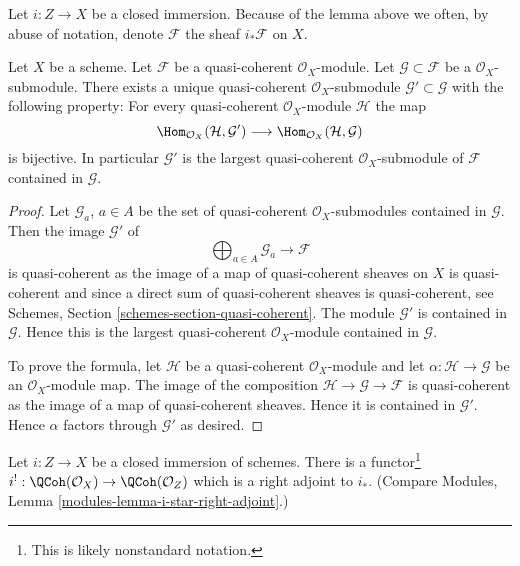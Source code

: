 \noindent
Let $i : Z \to X$ be a closed immersion. Because of the lemma above we often,
by abuse of notation, denote $\mathcal{F}$ the sheaf $i_*\mathcal{F}$ on $X$.

\begin{lemma}
\label{lemma-largest-quasi-coherent-subsheaf}
Let $X$ be a scheme. Let $\mathcal{F}$ be a quasi-coherent
$\mathcal{O}_X$-module. Let $\mathcal{G} \subset \mathcal{F}$
be a $\mathcal{O}_X$-submodule. There exists a unique quasi-coherent
$\mathcal{O}_X$-submodule $\mathcal{G}' \subset \mathcal{G}$
with the following property: For every quasi-coherent $\mathcal{O}_X$-module
$\mathcal{H}$ the map
$$
\Hom_{\mathcal{O}_X}(\mathcal{H}, \mathcal{G}')
\longrightarrow
\Hom_{\mathcal{O}_X}(\mathcal{H}, \mathcal{G})
$$
is bijective. In particular $\mathcal{G}'$ is the largest quasi-coherent
$\mathcal{O}_X$-submodule of $\mathcal{F}$ contained in $\mathcal{G}$.
\end{lemma}

\begin{proof}
Let $\mathcal{G}_a$, $a \in A$ be the set of quasi-coherent
$\mathcal{O}_X$-submodules contained in $\mathcal{G}$.
Then the image $\mathcal{G}'$ of
$$
\bigoplus\nolimits_{a \in A} \mathcal{G}_a \longrightarrow \mathcal{F}
$$
is quasi-coherent as the image of a map of quasi-coherent sheaves
on $X$ is quasi-coherent and since a direct sum of quasi-coherent sheaves
is quasi-coherent, see
Schemes, Section \ref{schemes-section-quasi-coherent}.
The module $\mathcal{G}'$ is contained in $\mathcal{G}$. Hence this is the
largest quasi-coherent $\mathcal{O}_X$-module contained in $\mathcal{G}$.

\medskip\noindent
To prove the formula, let $\mathcal{H}$ be a quasi-coherent
$\mathcal{O}_X$-module and let $\alpha : \mathcal{H} \to \mathcal{G}$
be an $\mathcal{O}_X$-module map. The image of the composition
$\mathcal{H} \to \mathcal{G} \to \mathcal{F}$ is quasi-coherent
as the image of a map of quasi-coherent sheaves. Hence it is contained
in $\mathcal{G}'$. Hence $\alpha$ factors through $\mathcal{G}'$
as desired.
\end{proof}

\begin{lemma}
\label{lemma-i-upper-shriek}
Let $i : Z \to X$ be a closed immersion of schemes.
There is a functor\footnote{This is likely nonstandard notation.}
$i^! : \QCoh(\mathcal{O}_X) \to \QCoh(\mathcal{O}_Z)$
which is a right adjoint to $i_*$. (Compare
Modules, Lemma \ref{modules-lemma-i-star-right-adjoint}.)
\end{lemma}

